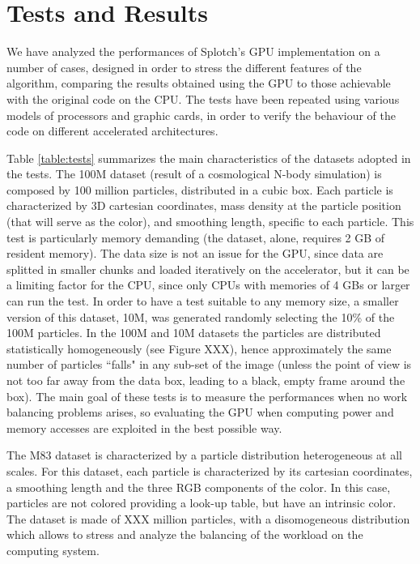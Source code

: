 \documentclass[11pt]{article}
\begin{document}
\section{Tests and Results}

We have analyzed the performances of Splotch's GPU implementation on a number of cases, designed in 
order to stress the different features of the algorithm, comparing the results 
obtained using the GPU to those achievable with the original code on the CPU. 
The tests have been repeated using various models of processors and graphic cards, 
in order to verify the behaviour of the code on different accelerated architectures.

Table \ref{table:tests} summarizes the main characteristics of the datasets adopted in the 
tests. The 100M dataset (result of a cosmological N-body simulation) 
is composed by 100 million particles, distributed in 
a cubic box. Each particle is characterized by 3D cartesian coordinates,
mass density at the particle position (that will serve as the color),
and smoothing length, specific to each particle. This test is particularly 
memory demanding (the dataset, alone, requires 2 GB 
of resident memory). The data size is not an issue for the GPU, since data are splitted 
in smaller chunks and loaded iteratively on the accelerator, but it can be a limiting factor
for the CPU, since only CPUs with memories of 4 GBs or larger can run the test. 
In order to have a test suitable to any memory size, 
a smaller version of this dataset, 10M, was generated 
randomly selecting the 10\% of the 100M particles. 
In the 100M and 10M datasets the particles are distributed 
statistically homogeneously (see Figure XXX), hence approximately the same 
number of particles ``falls" in any sub-set of the image (unless
the point of view is not too far away from the data box, leading to a black, empty 
frame around the box). The main goal of these tests is to measure the performances
when no work balancing problems arises, so evaluating the GPU when computing 
power and memory accesses are exploited in the best possible way. 

The M83 dataset is characterized by a particle distribution 
heterogeneous at all scales. For this dataset, each particle is characterized by its 
cartesian coordinates, a smoothing length and the three RGB components of the color. 
In this case, particles are not colored providing a look-up table,
but have an intrinsic color. The dataset is made of XXX million 
particles, with a  disomogeneous distribution which allows to stress 
and analyze the balancing of the workload on the computing system.
\end{document}
